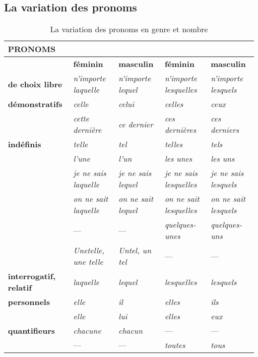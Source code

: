 \documentclass[UTF8]{report}
\begin{document}
\subsection{La variation des pronoms}
\begin{table}[H]
\centering
\small
\renewcommand{\arraystretch}{1.4}
\begin{tabular}{|>{\centering\arraybackslash}m{3.5cm}|>{\centering\arraybackslash}m{2.5cm}|>{\centering\arraybackslash}m{2.5cm}|>{\centering\arraybackslash}m{2.5cm}|>{\centering\arraybackslash}m{2.5cm}|}
\hline
\rowcolor{cyan!20}
\textbf{PRONOMS} & \multicolumn{2}{c|}{\textbf{SINGULIER}} & \multicolumn{2}{c|}{\textbf{PLURIEL}} \\
\hline
& \textbf{féminin} & \textbf{masculin} & \textbf{féminin} & \textbf{masculin} \\
\hline
\textbf{de choix libre} 
& \textit{n’importe laquelle} 
& \textit{n’importe lequel} 
& \textit{n’importe lesquelles} 
& \textit{n’importe lesquels} \\
\hline
\textbf{démonstratifs} 
& \textit{celle} 
& \textit{celui} 
& \textit{celles} 
& \textit{ceux} \\
\cline{2-5}
& \textit{cette dernière} 
& \textit{ce dernier} 
& \textit{ces dernières} 
& \textit{ces derniers} \\
\hline
\textbf{indéfinis} 
& \textit{telle} 
& \textit{tel} 
& \textit{telles} 
& \textit{tels} \\
\cline{2-5}
& \textit{l’une} 
& \textit{l’un} 
& \textit{les unes} 
& \textit{les uns} \\
\cline{2-5}
& \textit{je ne sais laquelle} 
& \textit{je ne sais lequel} 
& \textit{je ne sais lesquelles} 
& \textit{je ne sais lesquels} \\
\cline{2-5}
& \textit{on ne sait laquelle} 
& \textit{on ne sait lequel} 
& \textit{on ne sait lesquelles} 
& \textit{on ne sait lesquels} \\
\cline{2-5}
& — & — 
& \textit{quelques-unes} 
& \textit{quelques-uns} \\
\cline{2-5}
& \textit{Unetelle, une telle} 
& \textit{Untel, un tel} 
& — & — \\
\hline
\textbf{interrogatif, relatif} 
& \textit{laquelle} 
& \textit{lequel} 
& \textit{lesquelles} 
& \textit{lesquels} \\
\hline
\textbf{personnels} 
& \textit{elle} 
& \textit{il} 
& \textit{elles} 
& \textit{ils} \\
\cline{2-5}
& \textit{elle} 
& \textit{lui} 
& \textit{elles} 
& \textit{eux} \\
\hline
\textbf{quantifieurs} 
& \textit{chacune} 
& \textit{chacun} 
& — & — \\
\cline{2-5}
& — & — 
& \textit{toutes} 
& \textit{tous} \\
\hline
\end{tabular}
\caption{La variation des pronoms en genre et nombre}
\end{table}
\end{document}
